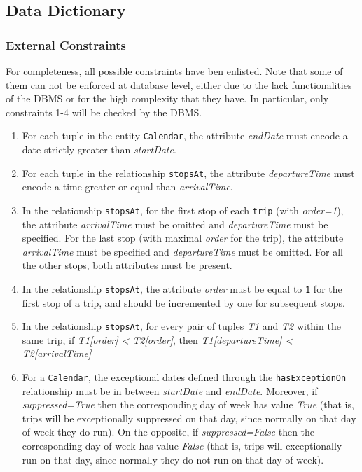 	\subsection{Data Dictionary}
	\label{sec:dictionary}

	\subsubsection{External Constraints}

	For completeness, all possible constraints have ben enlisted. Note that some of them can not be enforced at database level, either due to the lack functionalities of the DBMS or for the high complexity that they have. In particular, only constraints 1-4 will be checked by the DBMS.
	
	\begin{enumerate}
		\item For each tuple in the entity \texttt{Calendar}, the attribute \textit{endDate} must encode a date strictly greater than \textit{startDate}.
		
		\item For each tuple in the relationship \texttt{stopsAt}, the attribute \textit{departureTime} must encode a time greater or equal than \textit{arrivalTime}.
		
		\item In the relationship \texttt{stopsAt}, for the first stop of each \texttt{trip} (with \textit{order=1}), the attribute \textit{arrivalTime} must be omitted and \textit{departureTime} must be specified. For the last stop (with maximal \textit{order} for the trip), the attribute \textit{arrivalTime} must be specified and \textit{departureTime} must be omitted. For all the other stops, both attributes must be present.
		
		\item In the relationship \texttt{stopsAt}, the attribute \textit{order} must be equal to \texttt{1} for the first stop of a trip, and should be incremented by one for subsequent stops.
		
		\item In the relationship \texttt{stopsAt}, for every pair of tuples \textit{T1} and \textit{T2} within the same trip, if \textit{T1[order] < T2[order]}, then \textit{T1[departureTime] < T2[arrivalTime]}

		\item For a \texttt{Calendar}, the exceptional dates defined through the \texttt{hasExceptionOn} relationship must be in between \textit{startDate} and \textit{endDate}. Moreover, if \textit{suppressed=True} then the corresponding day of week has value \textit{True} (that is, trips will be exceptionally suppressed on that day, since normally on that day of week they do run). On the opposite, if \textit{suppressed=False} then the corresponding day of week has value \textit{False} (that is, trips will exceptionally run on that day, since normally they do not run on that day of week).
	\end{enumerate} 

